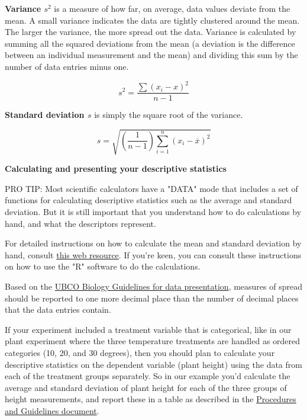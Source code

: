 \documentclass[
]{book}
\begin{document}
\textbf{Variance \(s{^2}\)} is a measure of how far, on average, data values deviate from the mean. A small variance indicates the data are tightly clustered around the mean. The larger the variance, the more spread out the data. Variance is calculated by summing all the squared deviations from the mean (a deviation is the difference between an individual measurement and the mean) and dividing this sum by the number of data entries minus one.

\[s^{2} =\frac{ \sum{(x_{i}-x)^{2}}}{n-1}\]

\textbf{Standard deviation \(s\)} is simply the square root of the variance.

\[s =\sqrt{(\frac{1}{n-1})\sum_{i=1}^{n}(x_{i}-\overline{x})^{2}}\]

\textbf{Calculating and presenting your descriptive statistics}

PRO TIP: Most scientific calculators have a "DATA" mode that includes a set of functions for calculating descriptive statistics such as the average and standard deviation. But it is still important that you understand how to do calculations by hand, and what the descriptors represent.

For detailed instructions on how to calculate the mean and standard deviation by hand, consult \href{https://www.khanacademy.org/math/statistics-probability/summarizing-quantitative-data/variance-standard-deviation-population/a/calculating-standard-deviation-step-by-step}{this web resource}. If you're keen, you can consult these instructions on how to use the "R" software to do the calculations.

Based on the \href{https://ubco-biology.github.io/Procedures-and-Guidelines/descriptive-summary-statistics.html}{UBCO Biology Guidelines for data presentation}, measures of spread should be reported to one more decimal place than the number of decimal places that the data entries contain.

If your experiment included a treatment variable that is categorical, like in our plant experiment where the three temperature treatments are handled as ordered categories (10, 20, and 30 degrees), then you should plan to calculate your descriptive statistics on the dependent variable (plant height) using the data from each of the treatment groups separately. So in our example you'd calculate the average and standard deviation of plant height for each of the three groups of height measurements, and report these in a table as described in the \href{https://ubco-biology.github.io/Procedures-and-Guidelines/tables.html}{Procedures and Guidelines document}.
\end{document}
